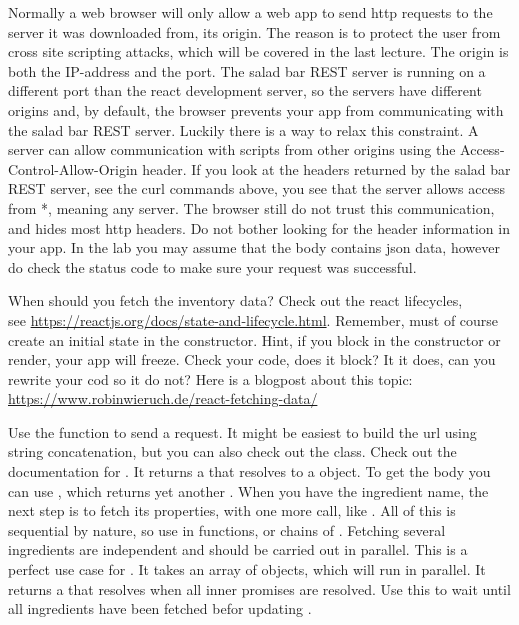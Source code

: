 \documentclass[fleqn, article, a4paper]{memoir}
\begin{document}
\begin{Assignments}
\item Normally a web browser will only allow a web app to send http requests to the server it was downloaded from, its origin. The reason is to protect the user from cross site scripting attacks, which will be covered in the last lecture. The origin is both the IP-address and the port. The salad bar REST server is running on a different port than the react development server, so the servers have different origins and, by default, the browser prevents your app from communicating with the salad bar REST server. Luckily there is a way to relax this constraint. A server can allow communication with scripts from other origins using the Access-Control-Allow-Origin header. If you look at the headers returned by the salad bar REST server, see the curl commands above, you see that the server allows access from *, meaning any server. The browser still do not trust this communication, and hides most http headers. Do not bother looking for the header information in your app. In the lab you may assume that the body contains json data, however do check the status code to make sure your request was successful.

When should you fetch the inventory data? Check out the react lifecycles, \\see \url{https://reactjs.org/docs/state-and-lifecycle.html}. Remember, must of course create an initial state in the constructor. Hint, if you block in the constructor or render, your app will freeze. Check your code, does it block? It it does, can you rewrite your cod so it do not? Here is a blogpost about this topic: \url{https://www.robinwieruch.de/react-fetching-data/}

Use the  function to send a request. It might be easiest to build the url using string concatenation, but you can also check out the  class. Check out the documentation for . It returns a  that resolves to a  object. To get the body you can use , which returns yet another . When you have the ingredient name, the next step is to fetch its properties, with one more call, like . All of this is sequential by nature, so use  in  functions, or chains of . Fetching several ingredients are independent and should be carried out in parallel. This is a perfect use case for . It takes an array of  objects, which will run in parallel. It returns a  that resolves when all inner promises are resolved. Use this to wait until all ingredients have been fetched befor updating .


\end{Assignments}
\end{document}
